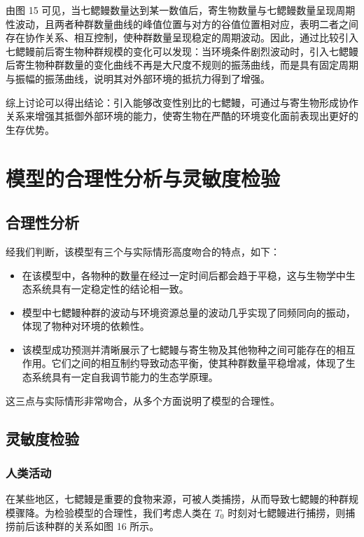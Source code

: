 \documentclass[11pt,a4paper]{ctexart}
\begin{document}
由图 15 可见，当七鳃鳗数量达到某一数值后，寄生物数量与七鳃鳗数量呈现周期性波动，且两者种群数量曲线的峰值位置与对方的谷值位置相对应，表明二者之间存在协作关系、相互控制，使种群数量呈现稳定的周期波动。因此，通过比较引入七鳃鳗前后寄生物种群规模的变化可以发现：当环境条件剧烈波动时，引入七鳃鳗后寄生物种群数量的变化曲线不再是大尺度不规则的振荡曲线，而是具有固定周期与振幅的振荡曲线，说明其对外部环境的抵抗力得到了增强。

综上讨论可以得出结论：引入能够改变性别比的七鳃鳗，可通过与寄生物形成协作关系来增强其抵御外部环境的能力，使寄生物在严酷的环境变化面前表现出更好的生存优势。

\section{模型的合理性分析与灵敏度检验}

\subsection{合理性分析}

经我们判断，该模型有三个与实际情形高度吻合的特点，如下：

\begin{itemize}
\item 在该模型中，各物种的数量在经过一定时间后都会趋于平稳，这与生物学中生态系统具有一定稳定性的结论相一致。
\item 模型中七鳃鳗种群的波动与环境资源总量的波动几乎实现了同频同向的振动，体现了物种对环境的依赖性。
\item 该模型成功预测并清晰展示了七鳃鳗与寄生物及其他物种之间可能存在的相互作用。它们之间的相互制约导致动态平衡，使其种群数量平稳增减，体现了生态系统具有一定自我调节能力的生态学原理。
\end{itemize}

这三点与实际情形非常吻合，从多个方面说明了模型的合理性。

\subsection{灵敏度检验}

\subsubsection{人类活动}

在某些地区，七鳃鳗是重要的食物来源，可被人类捕捞，从而导致七鳃鳗的种群规模骤降。为检验模型的合理性，我们考虑人类在 $T_{0}$ 时刻对七鳃鳗进行捕捞，则捕捞前后该种群的关系如图 16 所示。
\end{document}
